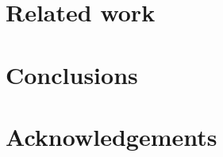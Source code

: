 \documentclass{llncs}
\begin{document}
\section{Related work}
\label{related}


%

\section{Conclusions}
\label{conclusions}


\section{Acknowledgements}
\label{ack}




\end{document}
